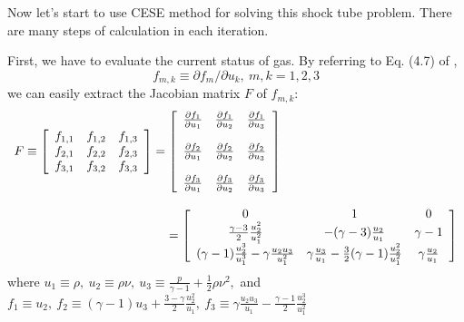 \documentclass[a4paper,12pt]{article}
\begin{document}
Now let's start to use CESE method for solving this shock tube problem. There are many steps of calculation in each iteration.

First, we have to evaluate the current status of gas. By referring to Eq. (4.7) of \cite{CESE_Shin_Chung_Chang_1995}, 
\begin{equation}
f_{m,k}\equiv\partial f_{m}/\partial u_{k},~m, k = 1, 2, 3
\end{equation}
we can easily extract the Jacobian matrix $F$ of $f_{m,k}$:
\begin{equation}
\begin{array}{l}
F\equiv\left[
       \begin{array}{ccc}
       f_{1,1} & f_{1,2} & f_{1,3} \\
       f_{2,1} & f_{2,2} & f_{2,3} \\
       f_{3,1} & f_{3,2} & f_{3,3}
       \end{array}
       \right] 
       =
       \left[
       \begin{array}{ccc}
       \frac{\partial f_{1}}{\partial u_{1}} & \frac{\partial f_{1}}{\partial u_{2}} & \frac{\partial f_{1}}{\partial u_{3}} \\ \\
       \frac{\partial f_{2}}{\partial u_{1}} & \frac{\partial f_{2}}{\partial u_{2}} & \frac{\partial f_{2}}{\partial u_{3}} \\ \\
       \frac{\partial f_{3}}{\partial u_{1}} & \frac{\partial f_{3}}{\partial u_{2}} & \frac{\partial f_{3}}{\partial u_{3}}
       \end{array}
       \right] \\ \\
       \hspace{44mm}=
       \left[
       \begin{array}{ccc}
       0 & 1 & 0 \\
       \frac{\gamma -3}{2}\frac{u^{2}_{2}}{u^{2}_{1}} & -(\gamma -3)\frac{u_{2}}{u_{1}} & \gamma -1 \\
       (\gamma -1)\frac{u^{3}_{2}}{u^{3}_{1}}-\gamma\frac{u_{2}u_{3}}{u^{2}_{1}} & \gamma\frac{u_{3}}{u_{1}}-\frac{3}{2}(\gamma -1)\frac{u^{2}_{2}}{u^{2}_{1}} & \gamma\frac{u_{2}}{u_{1}}
       \end{array}
       \right]
\end{array}
\end{equation}
where $u_{1}\equiv\rho,~u_{2}\equiv\rho\nu,~u_{3}\equiv\frac{p}{\gamma -1}+\frac{1}{2}\rho\nu^{2},$ \newline
and $f_{1}\equiv u_{2},~f_{2}\equiv(\gamma -1)u_{3}+\frac{3-\gamma}{2}\frac{u^{2}_{2}}{u_{1}},~f_{3}\equiv\gamma\frac{u_{2}u_{3}}{u_{1}}-\frac{\gamma -1}{2}\frac{u^{3}_{2}}{u^{2}_{1}}$
 
\end{document}
